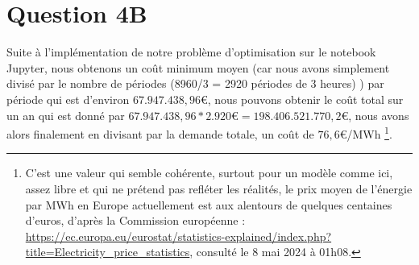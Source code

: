 \documentclass{article}
\begin{document}
\section*{Question 4B}
Suite à l'implémentation de notre problème d'optimisation sur le notebook Jupyter, nous obtenons 
un coût minimum moyen (car nous avons simplement divisé par le nombre de périodes (8960/3 = 2920 périodes de 3 heures)
) par période qui est d'environ $67.947.438,96$\euro, nous pouvons obtenir le coût total sur un an qui est donné par 
$67.947.438,96 * 2.920$\euro $= 198.406.521.770,2$\euro, nous avons alors finalement en divisant par la demande totale,
un coût de $76,6$\euro /MWh  \footnote{C'est une valeur qui semble cohérente, surtout pour un modèle comme ici, 
assez libre et qui ne prétend pas refléter les réalités, le prix moyen de l'énergie par MWh en Europe actuellement 
est aux alentours de quelques centaines d'euros, d'après la Commission européenne : 
\url{https://ec.europa.eu/eurostat/statistics-explained/index.php?title=Electricity_price_statistics}, 
consulté le 8 mai 2024 à 01h08.}.
\end{document}
